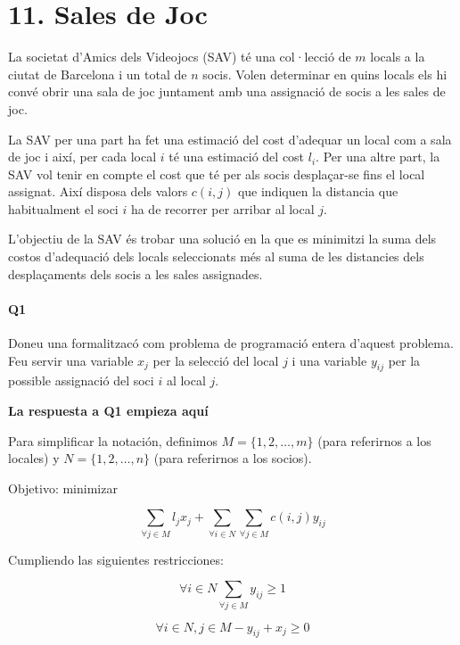 \section*{11. Sales de Joc}


La societat d'Amics dels Videojocs (SAV) té una col·lecció de $m$  locals a la ciutat de Barcelona i un total de $n$  socis. Volen determinar en quins locals els hi convé obrir una sala de joc juntament amb una assignació de socis a les sales de joc.

La SAV per una part ha fet una estimació del cost d'adequar un local com a sala de joc i així, per cada local $i$ té una estimació del cost $l_i$. Per una altre part, la SAV vol tenir en compte el cost que té per als socis desplaçar-se fins el local assignat. Així disposa dels valors $c(i,j)$ que indiquen la distancia que habitualment el soci $i$ ha de recorrer per arribar al local $j$.

L'objectiu de la SAV és trobar una solució en la que es minimitzi la suma dels costos d'adequació dels locals seleccionats més al suma de les distancies dels desplaçaments dels socis a les sales assignades.

\paragraph{Q1}
Doneu una formalitzacó com problema de programació entera d'aquest problema. Feu servir una variable $x_j$ per la selecció del local $j$ i una variable $y_{ij}$ per la possible assignació del soci $i$ al local $j$.

\textbf{La respuesta a Q1 empieza aquí}

Para simplificar la notación, definimos $M = \{1,2,\dots,m\}$ (para referirnos a los locales) y $N = \{1,2,\dots,n\}$ (para referirnos a los socios).

Objetivo: minimizar

\begin{equation}
 \sum_{\forall j \in M} l_jx_j + \sum_{\forall i \in N} \sum_{\forall j \in M} c(i,j)y_{ij}
\end{equation}

Cumpliendo las siguientes restricciones:

\begin{equation}
\label{r1}
 \forall i \in N \sum_{\forall j \in M} y_{ij} \geq 1
\end{equation}

\begin{equation}
\label{r2}
 \forall i \in N, j \in M -y_{ij} + x_j \geq 0
\end{equation}

